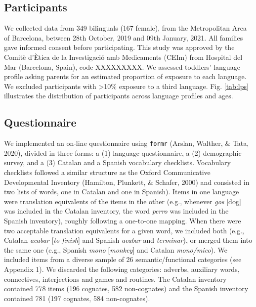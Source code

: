 \documentclass[
  english,
  man,man,floatsintext]{apa6}
\begin{document}
\hypertarget{participants}{%
\subsection{Participants}\label{participants}}

We collected data from 349 bilinguals (167 female), from the Metropolitan Area of Barcelona, between 28th October, 2019 and 09th January, 2021. All families gave informed consent before participating. This study was approved by the Comitè d'Ètica de la Investigació amb Medicaments (CEIm) from Hospital del Mar (Barcelona, Spain), code XXXXXXXXX. We assessed toddlers' language profile asking parents for an estimated proportion of exposure to each language. We excluded participants with \textgreater10\% exposure to a third language. Fig. \ref{tab:lps} illustrates the distribution of participants across language profiles and ages.

\hypertarget{questionnaire}{%
\subsection{Questionnaire}\label{questionnaire}}

We implemented an on-line questionnaire using \texttt{formr} (Arslan, Walther, \& Tata, 2020), divided in three forms: a (1) language questionnaire, a (2) demographic survey, and a (3) Catalan and a Spanish vocabulary checklists. Vocabulary checklists followed a similar structure as the Oxford Communicative Developmental Inventory (Hamilton, Plunkett, \& Schafer, 2000) and consisted in two lists of words, one in Catalan and one in Spanish). Items in one language were translation equivalents of the items in the other (e.g., whenever \emph{gos} {[}dog{]} was included in the Catalan inventory, the word \emph{perro} was included in the Spanish inventory), roughly following a one-to-one mapping. When there were two acceptable translation equivalents for a given word, we included both (e.g., Catalan \emph{acabar} {[}\emph{to finish}{]} and Spanish \emph{acabar} and \emph{terminar}), or merged them into the same one (e.g., Spanish \emph{mono} {[}\emph{monkey}{]} and Catalan \emph{mono/mico}). We included items from a diverse sample of 26 semantic/functional categories (see Appendix 1). We discarded the following categories: adverbs, auxiliary words, connectives, interjections and games and routines. The Catalan inventory contained 778 items (196 cognates, 582 non-cognates) and the Spanish inventory contained 781 (197 cognates, 584 non-cognates).
\end{document}
